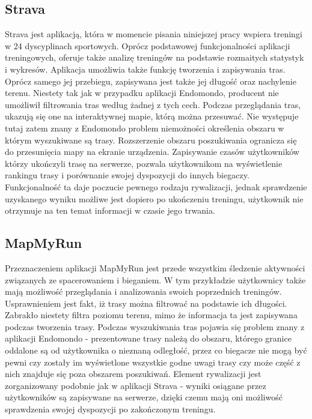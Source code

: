 \subsection{Strava}
Strava \cite{strava} jest aplikacją, która w momencie pisania niniejszej pracy wspiera treningi w 24 dyscyplinach sportowych. Oprócz podstawowej funkcjonalności aplikacji treningowych, oferuje także analizę treningów na podstawie rozmaitych statystyk i wykresów. Aplikacja umożliwia także funkcję tworzenia i zapisywania tras. Oprócz samego jej przebiegu, zapisywana jest także jej długość oraz nachylenie terenu. Niestety tak jak w przypadku aplikacji Endomondo, producent nie umożliwił filtrowania tras według żadnej z tych cech. Podczas przeglądania tras, ukazują się one na interaktywnej mapie, którą można przesuwać. Nie występuje tutaj zatem znany z Endomondo problem niemożności określenia obszaru w którym wyszukiwane są trasy. Rozszerzenie obszaru poszukiwania ogranicza się do przesunięcia mapy na ekranie urządzenia. Zapisywanie czasów użytkowników którzy ukończyli trasę na serwerze, pozwala użytkownikom na wyświetlenie rankingu trasy i porównanie swojej dyspozycji do innych biegaczy. Funkcjonalność ta daje poczucie pewnego rodzaju rywalizacji, jednak sprawdzenie uzyskanego wyniku możliwe jest dopiero po ukończeniu treningu, użytkownik nie otrzymuje na ten temat informacji w czasie jego trwania.
\subsection{MapMyRun}
Przeznaczeniem aplikacji MapMyRun \cite{mapmyrun} jest przede wszystkim śledzenie aktywności związanych ze spacerowaniem i bieganiem. W tym przykładzie użytkownicy także mają możliwość przeglądania i analizowania swoich poprzednich treningów. Usprawnieniem jest fakt, iż trasy można filtrować na podstawie ich długości. Zabrakło niestety filtra poziomu terenu, mimo że informacja ta jest zapisywana podczas tworzenia trasy. Podczas wyszukiwania tras pojawia się problem znany z aplikacji Endomondo - prezentowane trasy należą do obszaru, którego granice oddalone są od użytkownika o nieznaną odległość, przez co biegacze nie mogą być pewni czy zostały im wyświetlone wszystkie godne uwagi trasy czy może część z nich znajduje się poza obszarem poszukiwań. Element rywalizacji jest zorganizowany podobnie jak w aplikacji Strava - wyniki osiągane przez użytkowników są zapisywane na serwerze, dzięki czemu mają oni możliwość sprawdzenia swojej dyspozycji po zakończonym treningu.